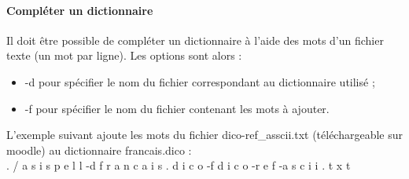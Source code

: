 \paragraph{Compléter un dictionnaire}
Il doit être possible de compléter un dictionnaire à l'aide des mots d'un fichier texte (un mot par ligne). Les options sont alors :
\begin{itemize}
\item -d pour spécifier le nom du fichier correspondant au dictionnaire utilisé ;
\item -f pour spécifier le nom du fichier contenant les mots à ajouter.
\end{itemize}
L'exemple suivant ajoute les mots du fichier dico-ref\_asscii.txt (téléchargeable sur moodle) au dictionnaire francais.dico :\\
. / a s i s p e l l -d f r a n c a i s . d i c o -f d i c o -r e f -a s c i i . t x t\\
\\
